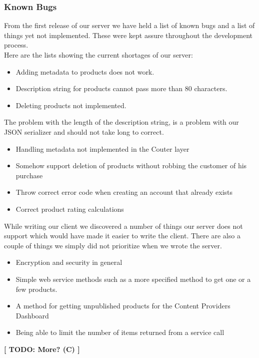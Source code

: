 \subsubsection{Known Bugs}
From the first release of our server we have held a list of known bugs and a list of things yet not implemented. These were kept assure throughout the development process.
\\Here are the lists showing the current shortages of our server:
\begin{itemize}
\item Adding metadata to products does not work.
\item Description string for products cannot pass more than 80 characters.
\item Deleting products not implemented.
\end{itemize}
The problem with the length of the description string, is a problem with our JSON serializer and should not take long to correct.
\begin{itemize}
\item Handling metadata not implemented in the C\Sh outer layer
\item Somehow support deletion of products without robbing the customer of his purchase
\item Throw correct error code when creating an account that already exists
\item Correct product rating calculations
\end{itemize}
While writing our client we discovered a number of things our server does not support which would have made it easier to write the client. There are also a couple of things we simply did not prioritize when we wrote the server.
\begin{itemize}
\item Encryption and security in general
\item Simple web service methods such as a more specified method to get one or a few products.
\item A method for getting unpublished products for the Content Providers Dashboard
\item Being able to limit the number of items returned from a service call
\end{itemize}
\textbf{[ TODO: More? (C) ]}